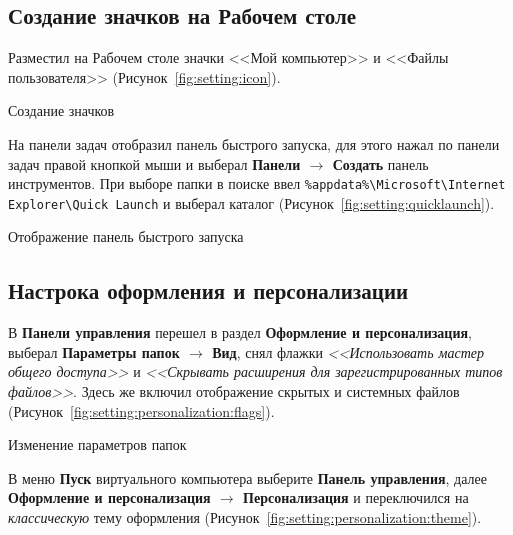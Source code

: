 \clearpage

\subsection{Создание значков на Рабочем столе}

Разместил на Рабочем столе значки <<Мой компьютер>> и <<Файлы пользователя>>
(Рисунок~\ref{fig:setting:icon}).

\begin{image}
	\caption{Создание значков}
	\label{fig:setting:icon}
\end{image}

На панели задач отобразил панель быстрого запуска,
для этого нажал по панели задач правой кнопкой мыши
и выберал \textbf{Панели $\rightarrow$ Создать} панель инструментов.
При выборе папки в поиске ввел
\verb|%appdata%\Microsoft\Internet Explorer\Quick Launch|
и выберал каталог (Рисунок~\ref{fig:setting:quicklaunch}).

\begin{image}
	\caption{Отображение панель быстрого запуска}
	\label{fig:setting:quicklaunch}
\end{image}

\clearpage

\subsection{Настрока оформления и персонализации}

В \textbf{Панели управления} перешел в раздел
\textbf{Оформление и персонализация}, выберал
\textbf{Параметры папок $\rightarrow$ Вид},
снял флажки \textit{<<Использовать мастер общего доступа>>} и
\textit{<<Скрывать расширения для зарегистрированных типов файлов>>}.
Здесь же включил отображение скрытых и системных файлов
(Рисунок~\ref{fig:setting:personalization:flags}).

\begin{image}
	\caption{Изменение параметров папок}
	\label{fig:setting:personalization:flags}
\end{image}

В меню \textbf{Пуск} виртуального компьютера выберите
\textbf{Панель управления}, далее
\textbf{Оформление и персонализация $\rightarrow$ Персонализация}
и переключился на \textit{классическую} тему оформления
(Рисунок~\ref{fig:setting:personalization:theme}).


